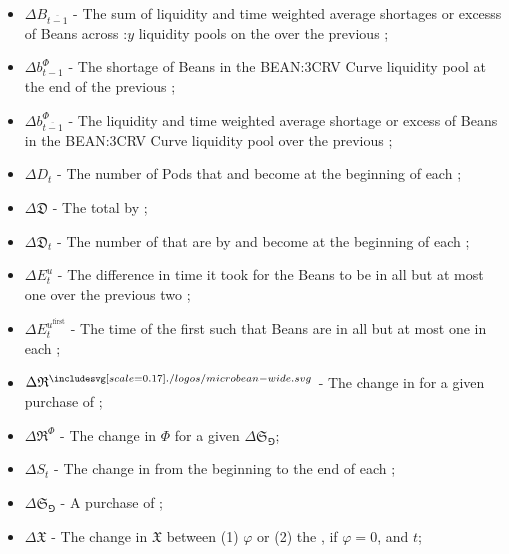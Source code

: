 \documentclass[class=article, crop=false]{standalone}
\begin{document}
\begin{itemize}[topsep=0pt, itemsep=3pt,leftmargin=16pt]
    \item[] $\Delta B_{\overline{t-1}}$ - \hypertarget{ht50}{The sum of liquidity and time weighted average shortages or excesss of Beans across \Bean:$y$ liquidity pools on the  over the previous };
    \item[] $\Delta b_{t-1}^{\Phi}$ - \hypertarget{ht51}{The shortage of Beans in the BEAN:3CRV Curve liquidity pool at the end of the previous };
    \item[] $\Delta b_{\overline{t-1}}^{\Phi}$ - \hypertarget{ht52}{The liquidity and time weighted average shortage or excess of Beans in the BEAN:3CRV Curve liquidity pool over the previous };
    \item[] $\Delta D_t$ - \hypertarget{ht53}{The number of Pods that  and become  at the beginning of each };
    \item[] $\Delta \mathfrak{D}$ - \hypertarget{ht54}{The total   by };
    \item[] $\Delta \mathfrak{D}_t$ - \hypertarget{ht55}{The number of  that are  by  and become  at the beginning of each };
    \item[] $\Delta E_{t}^{u}$ - \hypertarget{ht56}{The difference in time it took for the Beans to be  in all but at most one  over the previous two };
    \item[] $\Delta E_{t}^{u^{\text{first}}}$ - \hypertarget{ht57}{The time of the first  such that Beans are  in all but at most one  in each };
    \item[] $\Delta \mathfrak{R}^{\bean}$ - \hypertarget{ht58}{The change in  \Bean for a given purchase of };
    \item[] $\Delta \mathfrak{R}^{\Phi}$ - \hypertarget{ht59}{The change in  $\Phi$ for a given $\Delta \mathfrak{S}_{\Game}$};
    \item[] $\Delta S_t$ - \hypertarget{ht60}{The change in  from the beginning to the end of each };
    \item[] $\Delta \mathfrak{S}_{\Game}$ - \hypertarget{ht61}{A purchase of };
    \item[] $\Delta \mathfrak{X}$ - \hypertarget{ht62}{The change in $\mathfrak{X}$ between (1) $\varphi$ or (2) the , if $\varphi = 0$, and $t$};

\end{itemize}
\end{document}
